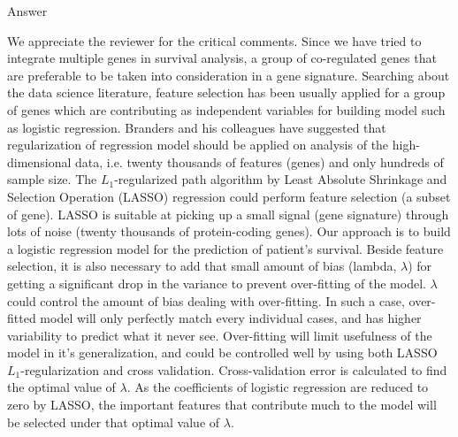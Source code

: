 \documentclass[preprint,12pt]{elsarticle}
\newenvironment{MyColorPar}[1]{%
    \leavevmode\color{#1}\ignorespaces%
}{%
}%
\begin{document}
%
\begin{MyColorPar}{blue}
Answer

We appreciate the reviewer for the critical comments.
Since we have tried to integrate multiple genes in survival analysis, a group of co-regulated genes that are preferable to be taken into consideration in a gene signature.
Searching about the data science literature, feature selection has been usually applied for a group of genes which are contributing as independent variables for building model such as logistic regression. %
Branders and his colleagues\cite{Branders2014} have suggested that regularization of regression model should be applied on analysis of the high-dimensional data, i.e. twenty thousands of features (genes) and only hundreds of sample size.
The $L_{1}$-regularized path algorithm by Least Absolute Shrinkage and Selection Operation (LASSO) regression could perform feature selection (a subset of gene).
LASSO is suitable at picking up a small signal (gene signature) through lots of noise (twenty thousands of protein-coding genes).
Our approach is to build a logistic regression model for the prediction of patient's survival.
Beside feature selection,
it is also necessary to add that small amount of bias (lambda, $\lambda$) for getting a significant drop in the variance to prevent over-fitting of the model.
$\lambda$ could control the amount of bias dealing with over-fitting.
In such a case, over-fitted model will only perfectly match every individual cases, and has higher variability to predict what it never see.
Over-fitting will limit usefulness of the model in it's generalization, and could be controlled well by using both LASSO $L_{1}$-regularization and cross validation.
Cross-validation error is calculated to find the optimal value of $\lambda$.
As the coefficients of logistic regression are reduced to zero by LASSO, %
the important features that contribute much to the model will be selected under that optimal value of $\lambda$.
 


\end{MyColorPar}
\end{document}
